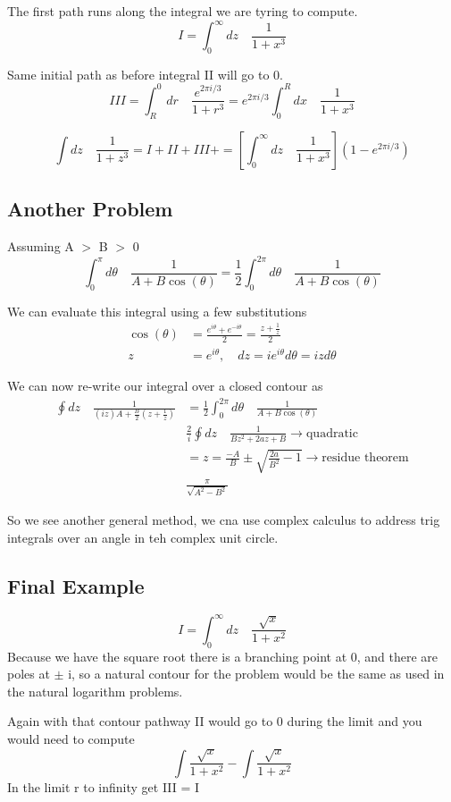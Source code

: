 \documentclass{article}
\newcommand{\be}{\begin{equation}}
\newcommand{\ee}{\end{equation}}
\begin{document}
The first path runs along the integral we are tyring to compute.
\be
I = \int_0^\infty dz \quad \frac{1}{1+x^3}
\ee

Same initial path as before integral II will go to 0.
\be
III = \int_R^0 dr \quad \frac{e^{2\pi i/3}}{1+r^3} = e^{2\pi i/3} \int_0^R dx \quad \frac{1}{1+x^3}
\ee


\be
\int dz \quad \frac{1}{1+z^3} = I + II + III+ = \left[\int_0^\infty dz \quad \frac{1}{1+x^3}\right] \left(1-e^{2\pi i/3}\right)
\ee

\subsection*{Another Problem}
Assuming A $>$ B $>$ 0
\be
\int_0^\pi d\theta \quad \frac{1}{A+B\cos(\theta)} = \frac{1}{2} \int_0^{2\pi} d\theta \quad \frac{1}{A+B\cos(\theta)}
\ee

We can evaluate this integral using a few substitutions
\be
\begin{split}
    \cos(\theta) &= \frac{e^{i\theta} + e^{-i\theta}}{2} = \frac{z + \frac{1}{z}}{2}\\
    z &= e^{i\theta}, \quad dz = ie^{i\theta} d\theta = izd\theta
\end{split}
\ee

We can now re-write our integral over a closed contour as
\be
\begin{split}
    \oint dz \quad \frac{1}{(iz)A+\frac{B}{2}\left(z+\frac{1}{z}\right)} &= \frac{1}{2} \int_0^{2\pi} d\theta \quad \frac{1}{A+B\cos(\theta)}\\
    & \frac{2}{i} \oint dz \quad \frac{1}{Bz^2 + 2az + B} \rightarrow \text{quadratic}\\
    &= z = \frac{-A}{B} \pm \sqrt{\frac{2a}{B^2}-1} \rightarrow \text{residue theorem}\\
    & \frac{\pi}{\sqrt{A^2 - B^2}}
\end{split}
\ee

So we see another general method, we cna use complex calculus to address trig integrals  over an angle in teh complex unit circle. 

\subsection*{Final Example}
\be
I = \int_0^\infty dz \quad \frac{\sqrt{x}}{1+x^2}
\ee
Because we have the square root there is a branching point at 0, and there are poles at $\pm$ i, so a natural contour for the problem would be the same as used in the natural logarithm problems.

Again with that contour pathway II would go to 0 during the limit and you would need to compute
\be
\int \frac{\sqrt{x}}{1+x^2} - \int \frac{\sqrt{x}}{1+x^2}
\ee
In the limit r to infinity get III = I 
\end{document}
